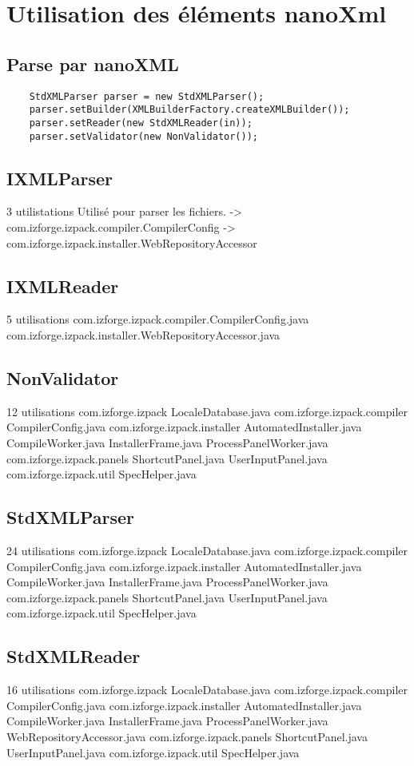 \section{Utilisation des éléments nanoXml}

\subsection{Parse par nanoXML}
\begin{verbatim}
	StdXMLParser parser = new StdXMLParser();
	parser.setBuilder(XMLBuilderFactory.createXMLBuilder());
	parser.setReader(new StdXMLReader(in));
	parser.setValidator(new NonValidator());
\end{verbatim}
\subsection{IXMLParser}
3 utilistations
 Utilisé pour parser les fichiers.
 -> com.izforge.izpack.compiler.CompilerConfig
 -> com.izforge.izpack.installer.WebRepositoryAccessor
\subsection{IXMLReader}
5 utilisations
com.izforge.izpack.compiler.CompilerConfig.java
com.izforge.izpack.installer.WebRepositoryAccessor.java
\subsection{NonValidator}
12 utilisations
  com.izforge.izpack
    LocaleDatabase.java
  com.izforge.izpack.compiler
    CompilerConfig.java
  com.izforge.izpack.installer
    AutomatedInstaller.java
    CompileWorker.java
    InstallerFrame.java
    ProcessPanelWorker.java
  com.izforge.izpack.panels
    ShortcutPanel.java
    UserInputPanel.java
  com.izforge.izpack.util
    SpecHelper.java
\subsection{StdXMLParser}
24 utilisations
  com.izforge.izpack
    LocaleDatabase.java 
  com.izforge.izpack.compiler 
    CompilerConfig.java 
  com.izforge.izpack.installer 
    AutomatedInstaller.java 
    CompileWorker.java 
    InstallerFrame.java 
    ProcessPanelWorker.java 
  com.izforge.izpack.panels 
    ShortcutPanel.java 
    UserInputPanel.java 
  com.izforge.izpack.util 
    SpecHelper.java 
\subsection{StdXMLReader}
16 utilisations
  com.izforge.izpack 
    LocaleDatabase.java 
  com.izforge.izpack.compiler 
    CompilerConfig.java 
  com.izforge.izpack.installer 
    AutomatedInstaller.java 
    CompileWorker.java 
    InstallerFrame.java 
    ProcessPanelWorker.java 
    WebRepositoryAccessor.java 
  com.izforge.izpack.panels 
    ShortcutPanel.java 
    UserInputPanel.java 
  com.izforge.izpack.util 
    SpecHelper.java 
